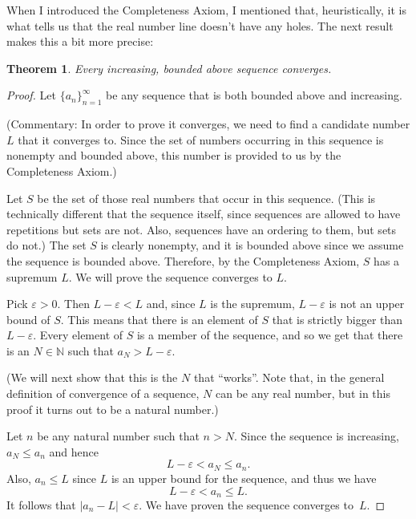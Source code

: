 \documentclass[12pt]{amsart}
\def\e{\varepsilon}
\newcommand{\N}{\mathbb{N}}
\numberwithin{equation}{section}
\theoremstyle{plain} %
\newtheorem{thm}[equation]{Theorem}
\theoremstyle{definition}
\theoremstyle{remark}
\newtheorem{rem}[equation]{Remark}
\begin{document}
 
When I introduced the Completeness Axiom, I mentioned that, heuristically, it is what tells us that the real number line doesn't have any
holes. The next result makes this a bit more precise:

\begin{thm}\label{thm226}
Every increasing, bounded above sequence converges.
\end{thm}

\begin{proof} Let $\{a_n\}_{n=1}^\infty$ be any sequence that is both  bounded above and increasing.

(Commentary: In order to prove it converges, we need to find a candidate number $L$ that
  it converges to. Since the set of numbers occurring in this sequence is nonempty and bounded above, this number is provided to us by the Completeness Axiom.) 

Let $S$ be the set of those real numbers that occur in this sequence. (This is technically different that the sequence itself, since sequences are allowed to
have repetitions but sets are not. Also, sequences have an ordering to
them, but sets do not.) 
The set $S$ is clearly
  nonempty, and it is bounded above since we assume the sequence is bounded above. Therefore, by the Completeness Axiom, $S$ has a supremum $L$. We will prove the
  sequence converges to $L$.

Pick $\e > 0$. Then $L - \e < L$ and, since $L$ is the supremum, $L - \e$ is not an upper bound of $S$. This means that 
there is an element of $S$ that is strictly bigger than $L- \e$. Every element of $S$ is a member of the sequence, and so we get that there is an $N \in \N$ such that $a_N > L - \e$. 

(We will next show that this is the $N$ that ``works''. Note that, in the general definition of convergence of a sequence, $N$ can be any real number, but in this proof it turns
out to be a natural number.)

Let $n$ be any natural number such that $n > N$. Since the sequence is increasing, $a_N \leq a_n$ and hence
$$
L - \e < a_N \leq a_n.
$$
Also, $a_n \leq L$ since $L$ is an upper bound for the sequence, and thus we have
$$
L- \e < a_n \leq L.
$$
It follows that  $|a_n - L| < \e$. We have proven the sequence converges to~$L$.
\end{proof}

\end{document}
